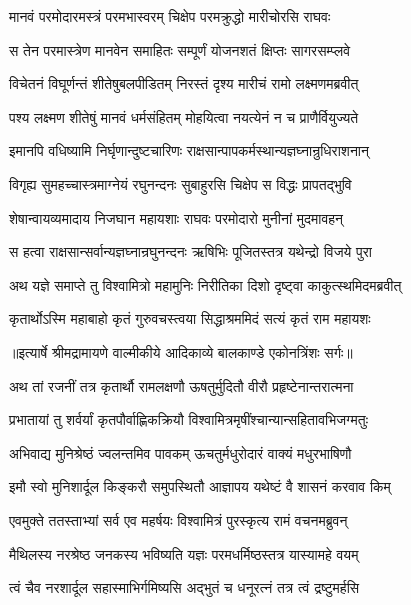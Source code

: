 \twolineshloka
{मानवं परमोदारमस्त्रं परमभास्वरम्}
{चिक्षेप परमक्रुद्धो मारीचोरसि राघवः} %

\twolineshloka
{स तेन परमास्त्रेण मानवेन समाहितः}
{सम्पूर्णं योजनशतं क्षिप्तः सागरसम्प्लवे} %

\twolineshloka
{विचेतनं विघूर्णन्तं शीतेषुबलपीडितम्}
{निरस्तं दृश्य मारीचं रामो लक्ष्मणमब्रवीत्} %

\twolineshloka
{पश्य लक्ष्मण शीतेषुं मानवं धर्मसंहितम्}
{मोहयित्वा नयत्येनं न च प्राणैर्वियुज्यते} %

\twolineshloka
{इमानपि वधिष्यामि निर्घृणान्दुष्टचारिणः}
{राक्षसान्पापकर्मस्थान्यज्ञघ्नान्रुधिराशनान्} %

\twolineshloka
{विगृह्य सुमहच्चास्त्रमाग्नेयं रघुनन्दनः}
{सुबाहुरसि चिक्षेप स विद्धः प्रापतद्भुवि} %

\twolineshloka
{शेषान्वायव्यमादाय निजघान महायशाः}
{राघवः परमोदारो मुनीनां मुदमावहन्} %

\twolineshloka
{स हत्वा राक्षसान्सर्वान्यज्ञघ्नान्रघुनन्दनः}
{ऋषिभिः पूजितस्तत्र यथेन्द्रो विजये पुरा} %

\twolineshloka
{अथ यज्ञे समाप्ते तु विश्वामित्रो महामुनिः}
{निरीतिका दिशो दृष्ट्वा काकुत्स्थमिदमब्रवीत्} %

\twolineshloka
{कृतार्थोऽस्मि महाबाहो कृतं गुरुवचस्त्वया}
{सिद्धाश्रममिदं सत्यं कृतं राम महायशः} %


{॥इत्यार्षे श्रीमद्रामायणे वाल्मीकीये आदिकाव्ये बालकाण्डे एकोनत्रिंशः सर्गः॥}


\twolineshloka
{अथ तां रजनीं तत्र कृतार्थौ रामलक्षणौ}
{ऊषतुर्मुदितौ वीरौ प्रहृष्टेनान्तरात्मना} %

\twolineshloka
{प्रभातायां तु शर्वर्यां कृतपौर्वाह्णिकक्रियौ}
{विश्वामित्रमृषींश्चान्यान्सहितावभिजग्मतुः} %

\twolineshloka
{अभिवाद्य मुनिश्रेष्ठं ज्वलन्तमिव पावकम्}
{ऊचतुर्मधुरोदारं वाक्यं मधुरभाषिणौ} %

\twolineshloka
{इमौ स्वो मुनिशार्दूल किङ्करौ समुपस्थितौ}
{आज्ञापय यथेष्टं वै शासनं करवाव किम्} %

\twolineshloka
{एवमुक्ते ततस्ताभ्यां सर्व एव महर्षयः}
{विश्वामित्रं पुरस्कृत्य रामं वचनमब्रुवन्} %

\twolineshloka
{मैथिलस्य नरश्रेष्ठ जनकस्य भविष्यति}
{यज्ञः परमधर्मिष्ठस्तत्र यास्यामहे वयम्} %

\twolineshloka
{त्वं चैव नरशार्दूल सहास्माभिर्गमिष्यसि}
{अद्भुतं च धनूरत्नं तत्र त्वं द्रष्टुमर्हसि} %

